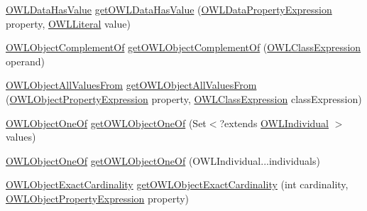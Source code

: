\begin{DoxyCompactItemize}
\item 
\hyperlink{interfaceorg_1_1semanticweb_1_1owlapi_1_1model_1_1_o_w_l_data_has_value}{O\-W\-L\-Data\-Has\-Value} \hyperlink{classuk_1_1ac_1_1manchester_1_1cs_1_1owl_1_1owlapi_1_1_o_w_l_data_factory_impl_a2566695f51492be5dc4aa2562e4a9a8f}{get\-O\-W\-L\-Data\-Has\-Value} (\hyperlink{interfaceorg_1_1semanticweb_1_1owlapi_1_1model_1_1_o_w_l_data_property_expression}{O\-W\-L\-Data\-Property\-Expression} property, \hyperlink{interfaceorg_1_1semanticweb_1_1owlapi_1_1model_1_1_o_w_l_literal}{O\-W\-L\-Literal} value)
\item 
\hyperlink{interfaceorg_1_1semanticweb_1_1owlapi_1_1model_1_1_o_w_l_object_complement_of}{O\-W\-L\-Object\-Complement\-Of} \hyperlink{classuk_1_1ac_1_1manchester_1_1cs_1_1owl_1_1owlapi_1_1_o_w_l_data_factory_impl_acee446579fda88fcbae0af89bd6a4d5e}{get\-O\-W\-L\-Object\-Complement\-Of} (\hyperlink{interfaceorg_1_1semanticweb_1_1owlapi_1_1model_1_1_o_w_l_class_expression}{O\-W\-L\-Class\-Expression} operand)
\item 
\hyperlink{interfaceorg_1_1semanticweb_1_1owlapi_1_1model_1_1_o_w_l_object_all_values_from}{O\-W\-L\-Object\-All\-Values\-From} \hyperlink{classuk_1_1ac_1_1manchester_1_1cs_1_1owl_1_1owlapi_1_1_o_w_l_data_factory_impl_a77ec5dd01700f20f0b82dd2ff0b3a795}{get\-O\-W\-L\-Object\-All\-Values\-From} (\hyperlink{interfaceorg_1_1semanticweb_1_1owlapi_1_1model_1_1_o_w_l_object_property_expression}{O\-W\-L\-Object\-Property\-Expression} property, \hyperlink{interfaceorg_1_1semanticweb_1_1owlapi_1_1model_1_1_o_w_l_class_expression}{O\-W\-L\-Class\-Expression} class\-Expression)
\item 
\hyperlink{interfaceorg_1_1semanticweb_1_1owlapi_1_1model_1_1_o_w_l_object_one_of}{O\-W\-L\-Object\-One\-Of} \hyperlink{classuk_1_1ac_1_1manchester_1_1cs_1_1owl_1_1owlapi_1_1_o_w_l_data_factory_impl_a55b43cd032fd1f1dda2b5bd454114f64}{get\-O\-W\-L\-Object\-One\-Of} (Set$<$?extends \hyperlink{interfaceorg_1_1semanticweb_1_1owlapi_1_1model_1_1_o_w_l_individual}{O\-W\-L\-Individual} $>$ values)
\item 
\hyperlink{interfaceorg_1_1semanticweb_1_1owlapi_1_1model_1_1_o_w_l_object_one_of}{O\-W\-L\-Object\-One\-Of} \hyperlink{classuk_1_1ac_1_1manchester_1_1cs_1_1owl_1_1owlapi_1_1_o_w_l_data_factory_impl_a10fba8358d08ca23c294bc405617fba6}{get\-O\-W\-L\-Object\-One\-Of} (O\-W\-L\-Individual...\-individuals)
\item 
\hyperlink{interfaceorg_1_1semanticweb_1_1owlapi_1_1model_1_1_o_w_l_object_exact_cardinality}{O\-W\-L\-Object\-Exact\-Cardinality} \hyperlink{classuk_1_1ac_1_1manchester_1_1cs_1_1owl_1_1owlapi_1_1_o_w_l_data_factory_impl_a6724542d7f89b734ca192d14259c6f1d}{get\-O\-W\-L\-Object\-Exact\-Cardinality} (int cardinality, \hyperlink{interfaceorg_1_1semanticweb_1_1owlapi_1_1model_1_1_o_w_l_object_property_expression}{O\-W\-L\-Object\-Property\-Expression} property)

\end{DoxyCompactItemize}
